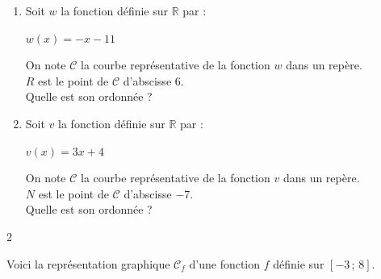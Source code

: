 {%
\begin{Exercice}%
\leavevmode\vspace{-\baselineskip}
\begin{enumerate}[itemsep=1em]
	\item \begin{minipage}[t]{\linewidth}Soit $w$ la fonction définie sur $\mathbb{R}$ par :
              \begin{center}
$w(x)=-x-11$
\end{center}
              On note $\mathscr{C}$ la courbe représentative de la fonction $w$ dans un repère.\\
             $R$ est le point de $\mathscr{C}$ d'abscisse $6$. \\Quelle est son ordonnée ? \end{minipage}
	\item \begin{minipage}[t]{\linewidth}Soit $v$ la fonction définie sur $\mathbb{R}$ par :
              \begin{center}
$v(x)=3x+4$
\end{center}
              On note $\mathscr{C}$ la courbe représentative de la fonction $v$ dans un repère.\\
             $N$ est le point de $\mathscr{C}$ d'abscisse $-7$. \\Quelle est son ordonnée ? \end{minipage}
\end{enumerate}
\vspace{-0.5cm}
\end{Exercice}

\begin{multicols}{2}
\begin{Exercice}%

Voici la représentation graphique $\mathscr{C}_f$ d'une fonction $f$ définie sur $[-3\,;\,8]$.\\
\end{Exercice}
\end{multicols}}
